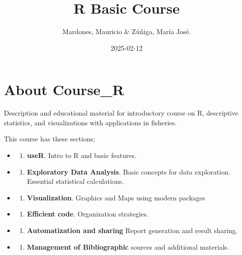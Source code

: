 \documentclass[
]{book}
\title{R Basic Course}
\author{Mardones, Mauricio \& Zúñiga, María José.}
\date{2025-02-12}
\providecommand{\tightlist}{%
  \setlength{\itemsep}{0pt}\setlength{\parskip}{0pt}}
\begin{document}
\maketitle

{
\hypersetup{linkcolor=}
\setcounter{tocdepth}{1}
\tableofcontents
}
\hypertarget{about-course_r}{%
\chapter*{About Course\_R}\label{about-course_r}}

Description and educational material for introductory course on R, descriptive statistics, and visualizations with applications in fisheries.

This course has these sections;

\begin{itemize}
\item
  \begin{enumerate}
  \def\labelenumi{\arabic{enumi}.}
  \tightlist
  \item
    \textbf{useR}. Intro to R and basic features.
  \end{enumerate}
\item
  \begin{enumerate}
  \def\labelenumi{\arabic{enumi}.}
  \setcounter{enumi}{1}
  \tightlist
  \item
    \textbf{Exploratory Data Analysis}. Basic concepts for data exploration. Essential statistical calculations.
  \end{enumerate}
\item
  \begin{enumerate}
  \def\labelenumi{\arabic{enumi}.}
  \setcounter{enumi}{2}
  \tightlist
  \item
    \textbf{Visualization}. Graphics and Maps using modern packages
  \end{enumerate}
\item
  \begin{enumerate}
  \def\labelenumi{\arabic{enumi}.}
  \setcounter{enumi}{3}
  \tightlist
  \item
    \textbf{Efficient code}. Organization strategies.\\
  \end{enumerate}
\item
  \begin{enumerate}
  \def\labelenumi{\arabic{enumi}.}
  \setcounter{enumi}{4}
  \tightlist
  \item
    \textbf{Automatization and sharing} Report generation and result sharing.\\
  \end{enumerate}
\item
  \begin{enumerate}
  \def\labelenumi{\arabic{enumi}.}
  \setcounter{enumi}{5}
  \tightlist
  \item
    \textbf{Management of Bibliographic} sources and additional materials.
  \end{enumerate}
\end{itemize}
\end{document}
